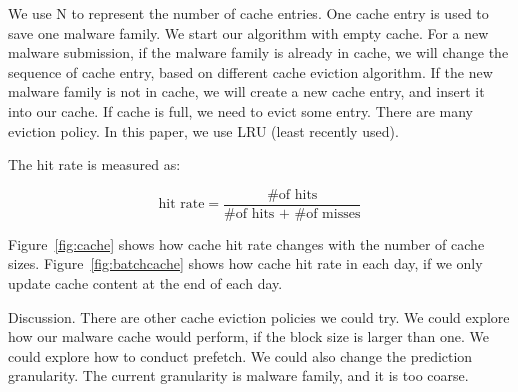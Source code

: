 We use N to represent the number of cache entries. 
One cache entry is used to save one malware family. 
We start our algorithm with empty cache. 
For a new malware submission, if the malware family is already in cache, 
we will change the sequence of cache entry, based on different cache eviction algorithm. 
If the new malware family is not in cache, we will create a new cache entry, 
and insert it into our cache. If cache is full, we need to evict some entry. 
There are many eviction policy. In this paper, we use LRU (least recently used). 

The hit rate is measured as: 

$$ \mbox{hit rate} = \dfrac{\mbox{\# of hits}}{\mbox{\# of hits + \# of misses}}$$

Figure~\ref{fig:cache} shows how cache hit rate changes with the number of cache sizes. 
Figure~\ref{fig:batchcache} shows how cache hit rate in each day, if we only update cache content at the end of each day. 

Discussion. 
There are other cache eviction policies we could try. 
We could explore how our malware cache would perform, if the block size is larger than one. We could explore how to conduct prefetch. 
We could also change the prediction granularity. 
The current granularity is malware family, and it is too coarse. 